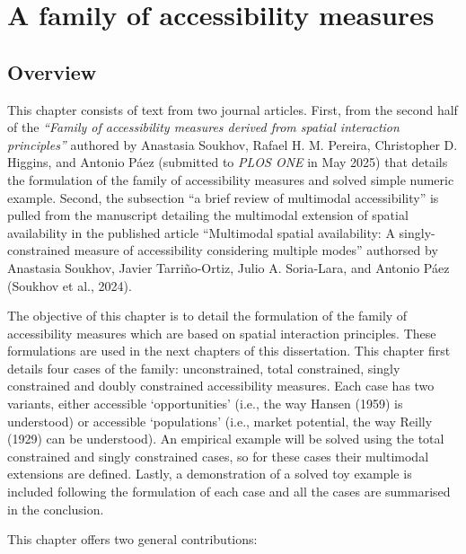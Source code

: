 \documentclass[
11pt, %
oneside, %
english, %
singlespacing, %
]{macthesis} %
\begin{document}
\chapter{A family of accessibility measures}\label{a-family-of-accessibility-measures}

\section{Overview}\label{overview-1}

This chapter consists of text from two journal articles. First, from the second half of the \emph{``Family of accessibility measures derived from spatial interaction principles''} authored by Anastasia Soukhov, Rafael H. M. Pereira, Christopher D. Higgins, and Antonio Páez (submitted to \emph{PLOS ONE} in May 2025) that details the formulation of the family of accessibility measures and solved simple numeric example. Second, the subsection ``a brief review of multimodal accessibility'' is pulled from the manuscript detailing the multimodal extension of spatial availability in the published article ``Multimodal spatial availability: A singly-constrained measure of accessibility considering multiple modes'' authorsed by Anastasia Soukhov, Javier Tarriño-Ortiz, Julio A. Soria-Lara, and Antonio Páez (Soukhov et al., 2024).

The objective of this chapter is to detail the formulation of the family of accessibility measures which are based on spatial interaction principles. These formulations are used in the next chapters of this dissertation.
This chapter first details four cases of the family: unconstrained, total constrained, singly constrained and doubly constrained accessibility measures. Each case has two variants, either accessible `opportunities' (i.e., the way Hansen (1959) is understood) or accessible `populations' (i.e., market potential, the way Reilly (1929) can be understood). An empirical example will be solved using the total constrained and singly constrained cases, so for these cases their multimodal extensions are defined. Lastly, a demonstration of a solved toy example is included following the formulation of each case and all the cases are summarised in the conclusion.

This chapter offers two general contributions:
\end{document}
